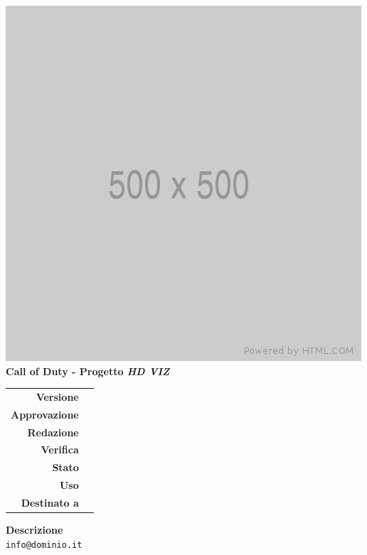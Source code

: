 %
%

\begin{titlepage}

	\begin{center}
		\includegraphics[scale = 0.5]{../_template/images/logo.png}\\
		\large \textbf{Call of Duty - Progetto \emph{HD VIZ}} \\
		\vfill
		\huge \textbf{\titolodocumento}
		\vspace*{\fill}
        
        \vfill
        \large
    \end{center}
    
	\begin{table}[htbp]
        \centering
        \begin{tabular}{r|l}
            \textbf{Versione} & \versione{} \\
            \textbf{Approvazione} & \approvazione{} \\
            \textbf{Redazione} & \redazione{} \\
            \textbf{Verifica} & \verifica{} \\
            \textbf{Stato} & \stato{} \\
            \textbf{Uso} & \uso{} \\
            \textbf{Destinato a} & \destinazione{}
        \end{tabular}
    \end{table}
    
    \begin{center}
        \vfill
        \normalsize
        \textbf{Descrizione}\\
		\descrizionedocumento
        \vfill
        \small
        \texttt{info@dominio.it}
	\end{center}
\end{titlepage}

%
